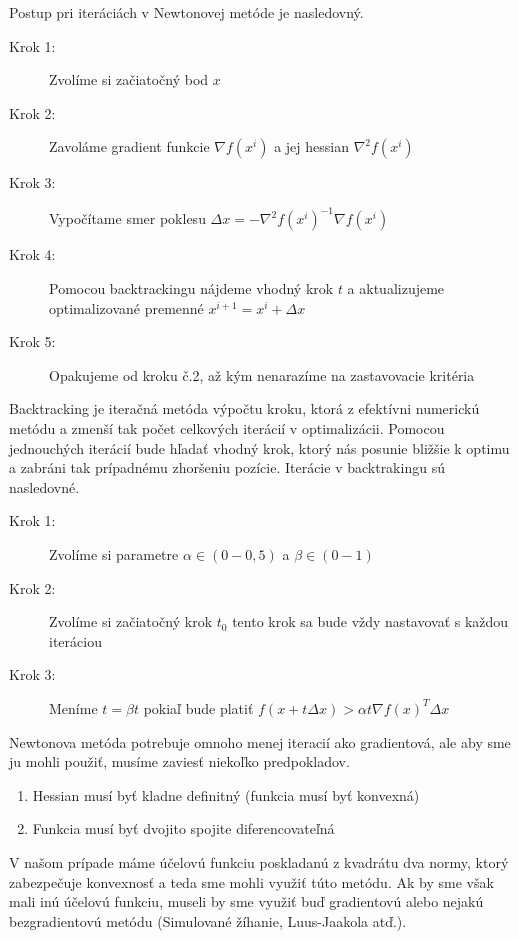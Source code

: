 Postup pri iteráciách v Newtonovej metóde je nasledovný.
\begin{description}
	\item[Krok 1:] {Zvolíme si začiatočný bod $x$}
	\item[Krok 2:] {Zavoláme gradient funkcie $\nabla f(x^{i})$ a jej hessian $\nabla^{2} f(x^{i})$}
	\item[Krok 3:] {Vypočítame smer poklesu $\Delta x = -\nabla^{2}f(x^{i})^{-1} \nabla f(x^{i})$}
	\item[Krok 4:] {Pomocou backtrackingu nájdeme vhodný krok $t$ a aktualizujeme optimalizované premenné $x^{i+1} = x^{i} + \Delta x $}
	\item[Krok 5:] {Opakujeme od kroku č.2, až kým nenarazíme na zastavovacie kritéria}
\end{description}
Backtracking je iteračná metóda výpočtu kroku, ktorá z efektívni numerickú metódu a zmenší tak počet celkových iterácií v optimalizácii. Pomocou jednouchých iterácií bude hľadať vhodný krok, ktorý nás posunie bližšie k optimu a zabráni tak prípadnému zhoršeniu pozície. Iterácie v backtrakingu sú nasledovné.
\begin{description}
	\item[Krok 1:] {Zvolíme si parametre $\alpha \in (0-0,5)$ a $\beta \in (0-1)$}
	\item[Krok 2:] {Zvolíme si začiatočný krok $t_0$ tento krok sa bude vždy nastavovať s každou iteráciou}
	\item[Krok 3:] {Meníme $t=\beta t$ pokiaľ bude platiť $f(x+t\Delta x) > \alpha t\nabla f(x)^{T}\Delta x$}
\end{description}
Newtonova metóda potrebuje omnoho menej iteracií ako gradientová, ale aby sme ju mohli použiť, musíme zaviesť niekoľko predpokladov.
\begin{enumerate}
	\item{
		Hessian musí byť kladne definitný (funkcia musí byť konvexná)
	}
	\item{
		Funkcia musí byť dvojito spojite diferencovateľná
	}
\end{enumerate}
V našom prípade máme účelovú funkciu poskladanú z kvadrátu dva normy, ktorý zabezpečuje konvexnosť a teda sme mohli využiť túto metódu. Ak by sme však mali inú účelovú funkciu, museli by sme využiť buď gradientovú  alebo nejakú bezgradientovú metódu (Simulované žíhanie, Luus-Jaakola atď.).

